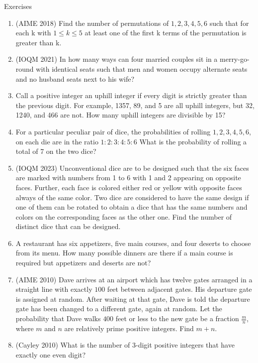 \begin{xcb}{Exercises}
\begin{enumerate}
\item (AIME 2018) Find the number of permutations of $1, 2, 3, 4, 5, 6$ such that for each k with $1 \leq k \leq 5$ at least one of the first k terms of the permutation is greater than k.
\item (IOQM 2021) In how many ways can four married couples sit in a merry-go-round with identical seats such that men and women occupy alternate seats and no husband seats next to his wife?
\item Call a positive integer an uphill integer if every digit is strictly greater than the previous digit. For example, 1357, 89, and 5 are all uphill integers, but 32, 1240, and 466 are not. How many uphill integers are divisible by 15?
\item For a particular peculiar pair of dice, the probabilities of rolling $1, 2, 3, 4, 5,6$, on each die are in the ratio $1 : 2 : 3 : 4 : 5 : 6$ What is the probability of rolling a total of 7 on the two dice?
\item (IOQM 2023) Unconventional dice are to be designed such that the six faces are marked with numbers from 1 to 6 with 1 and 2 appearing on opposite faces. Further, each face is colored either red or yellow with opposite faces always of the same color. Two dice are considered to have the same design if one of them can be rotated to obtain a dice that has the same numbers and colors on the corresponding faces as the other one. Find the number of distinct dice that can be designed.
\item A restaurant has six appetizers, five main courses, and four deserts to choose from its menu. How many possible dinners are there if a main course is required but appetizers and deserts are not?
\item (AIME 2010) Dave arrives at an airport which has twelve gates arranged in a straight line with exactly $100$ feet between adjacent gates. His departure gate is assigned at random. After waiting at that gate, Dave is told the departure gate has been changed to a different gate, again at random. Let the probability that Dave walks $400$ feet or less to the new gate be a fraction $\frac{m}{n}$, where $m$ and $n$ are relatively prime positive integers. Find $m+n$.
\item (Cayley 2010) What is the number of 3-digit positive integers that have exactly one even digit?
\end{enumerate}
\end{xcb}